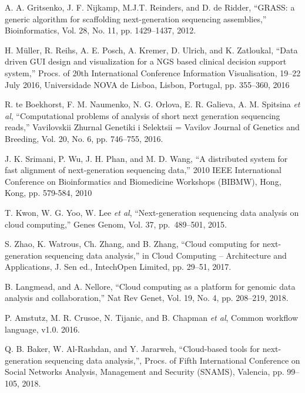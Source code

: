 \documentclass[a4paper]{jpconf}
\begin{document}
\begin{thebibliography}{0}
 A. A. Gritsenko, J. F. Nijkamp, M.J.T. Reinders, and D. de Ridder, ``GRASS: a generic algorithm for scaffolding next-generation sequencing assemblies,'' Bioinformatics, Vol. 28, No. 11, pp. 1429–1437, 2012. 

 H. Müller, R. Reihs, A. E. Posch, A. Kremer, D. Ulrich, and K. Zatloukal, ``Data driven GUI design and visualization for a NGS based clinical decision support system,'' Procs. of 20th International Conference Information Visualisation, 19--22 July 2016, Universidade NOVA de Lisboa, Lisbon, Portugal, pp. 355--360, 2016 

 R. te Boekhorst, F. M. Naumenko, N. G. Orlova, E. R. Galieva, A. M. Spitsina \emph{et al}, ``Computational problems of analysis of short next generation sequencing reads,'' Vavilovskii Zhurnal Genetiki i Selektsii = Vavilov Journal of Genetics and Breeding, Vol. 20, No. 6, pp. 746--755, 2016. 

 J. K. Srimani, P. Wu, J. H. Phan, and M. D. Wang, ``A distributed system for fast alignment of next-generation sequencing data,'' 2010 IEEE International Conference on Bioinformatics and Biomedicine Workshops (BIBMW), Hong, Kong, pp. 579-584, 2010 

 T. Kwon, W. G. Yoo, W. Lee \emph{et al}, ``Next-generation sequencing data analysis on cloud computing,'' Genes Genom, Vol. 37, pp.~489--501, 2015. 

 S. Zhao, K. Watrous, Ch. Zhang, and B. Zhang, ``Cloud computing for next-generation sequencing data analysis,'' in Cloud Computing -- Architecture and Applications, J. Sen ed., IntechOpen Limited, pp. 29--51, 2017. 

 B. Langmead, and A. Nellore, ``Cloud computing as a platform for genomic data analysis and collaboration,'' Nat Rev Genet, Vol. 19, No. 4, pp. 208--219, 2018. 

 P. Amstutz, M. R. Crusoe, N. Tijanic, and B. Chapman \emph{et al}, Common workflow language, v1.0. 2016. 

 Q. B. Baker, W. Al-Rashdan, and Y. Jararweh, ``Cloud-based tools for next-generation sequencing data analysis,'', Procs. of Fifth International Conference on Social Networks Analysis, Management and Security (SNAMS), Valencia, pp. 99--105, 2018. 


\end{thebibliography}
\end{document}
